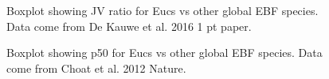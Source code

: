 \documentclass[12pt,a4paper,oneside]{article}
\begin{document}
\FloatBarrier

\begin{figure}[!hbtp]
\centering
{}
\caption{\small{Boxplot showing JV ratio for Eucs vs other global EBF species. Data come from De Kauwe et al. 2016 1 pt paper.}}
\label{}
\end{figure}


\FloatBarrier

\begin{figure}[!hbtp]
\centering
{}
\caption{\small{Boxplot showing p50 for Eucs vs other global EBF species. Data come from Choat et al. 2012 Nature.}}
\label{}
\end{figure}
\end{document}
